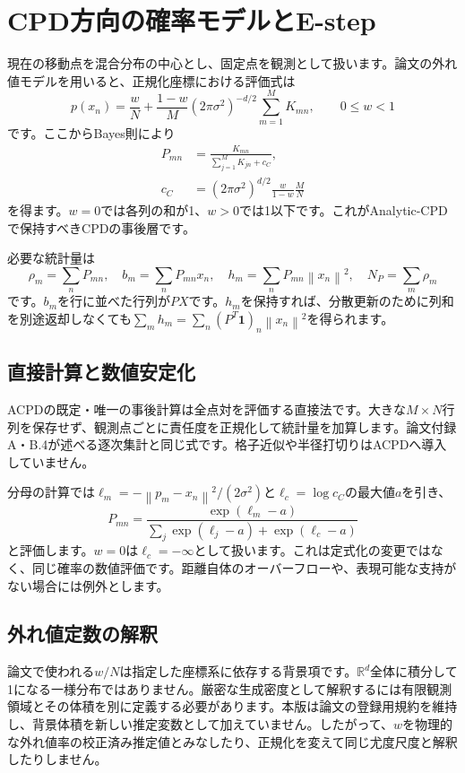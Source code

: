 \documentclass[a4paper,11pt]{article}
\newcommand{\R}{\mathbb{R}}
\newcommand{\norm}[1]{\left\lVert#1\right\rVert}
\numberwithin{equation}{section}
\begin{document}
\section{CPD方向の確率モデルとE-step}\label{sec:cpd}
現在の移動点を混合分布の中心とし、固定点を観測として扱います。論文の外れ値モデルを用いると、正規化座標における評価式は
\begin{equation}
 p(x_n)=\frac{w}{N}+\frac{1-w}{M}(2\pi\sigma^2)^{-d/2}
          \sum_{m=1}^{M}K_{mn},\qquad 0\leq w<1
\end{equation}
です。ここからBayes則により
\begin{align}
 P_{mn}&=\frac{K_{mn}}{\sum_{j=1}^{M}K_{jn}+c_C},\\
 c_C&=(2\pi\sigma^2)^{d/2}\frac{w}{1-w}\frac{M}{N}
\end{align}
を得ます。\(w=0\)では各列の和が1、\(w>0\)では1以下です。これがAnalytic-CPDで保持すべきCPDの事後層です。\cite[式(2)--(5)]{acpd}

必要な統計量は
\begin{equation}
 \rho_m=\sum_nP_{mn},\quad b_m=\sum_nP_{mn}x_n,\quad
 h_m=\sum_nP_{mn}\norm{x_n}^2,\quad N_P=\sum_m\rho_m
\end{equation}
です。\(b_m\)を行に並べた行列が\(PX\)です。\(h_m\)を保持すれば、分散更新のために列和を別途返却しなくても\(\sum_mh_m=\sum_n(P^T\mathbf1)_n\norm{x_n}^2\)を得られます。

\subsection{直接計算と数値安定化}
ACPDの既定・唯一の事後計算は全点対を評価する直接法です。大きな\(M\times N\)行列を保存せず、観測点ごとに責任度を正規化して統計量を加算します。論文付録A・B.4が述べる逐次集計と同じ式です。格子近似や半径打切りはACPDへ導入していません。\cite{acpd}

分母の計算では\(\ell_m=-\norm{p_m-x_n}^2/(2\sigma^2)\)と\(\ell_c=\log c_C\)の最大値\(a\)を引き、
\begin{equation}
 P_{mn}=\frac{\exp(\ell_m-a)}{
     \sum_j\exp(\ell_j-a)+\exp(\ell_c-a)}
\end{equation}
と評価します。\(w=0\)は\(\ell_c=-\infty\)として扱います。これは定式化の変更ではなく、同じ確率の数値評価です。距離自体のオーバーフローや、表現可能な支持がない場合には例外とします。

\subsection{外れ値定数の解釈}
論文で使われる\(w/N\)は指定した座標系に依存する背景項です。\(\R^d\)全体に積分して1になる一様分布ではありません。厳密な生成密度として解釈するには有限観測領域とその体積を別に定義する必要があります。本版は論文の登録用規約を維持し、背景体積を新しい推定変数として加えていません。したがって、\(w\)を物理的な外れ値率の校正済み推定値とみなしたり、正規化を変えて同じ尤度尺度と解釈したりしません。
\end{document}

